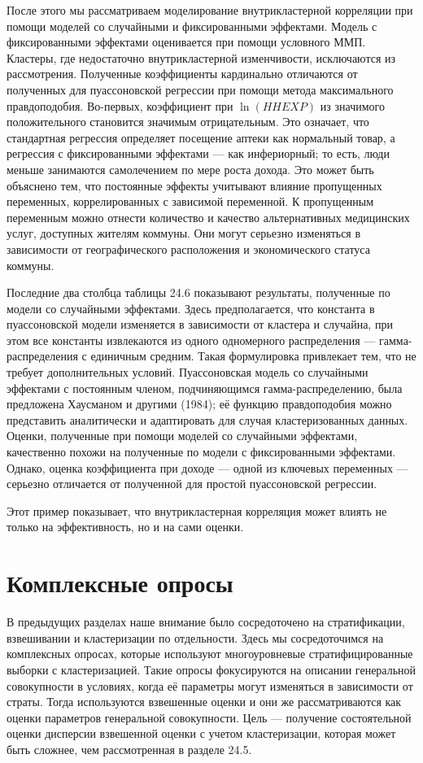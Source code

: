 После этого мы рассматриваем моделирование внутрикластерной корреляции при помощи моделей со случайными и фиксированными эффектами. Модель с фиксированными эффектами оценивается при помощи условного ММП. Кластеры, где недостаточно внутрикластерной изменчивости, исключаются из рассмотрения. Полученные коэффициенты кардинально отличаются от полученных для пуассоновской регрессии при помощи метода максимального правдоподобия. Во-первых, коэффициент при $\ln(HHEXP)$ из значимого положительного становится значимым отрицательным. Это означает, что стандартная регрессия определяет посещение аптеки как нормальный товар, а регрессия с фиксированными эффектами --- как инфериорный; то есть, люди меньше занимаются самолечением по мере роста дохода. Это может быть объяснено тем, что постоянные эффекты учитывают влияние пропущенных переменных, коррелированных с зависимой переменной. К пропущенным переменным можно отнести количество и качество альтернативных медицинских услуг, доступных жителям коммуны. Они могут серьезно изменяться в зависимости от географического расположения и экономического статуса коммуны. 

Последние два столбца таблицы 24.6 показывают результаты, полученные по модели со случайными эффектами. Здесь предполагается, что константа в пуассоновской модели изменяется в зависимости от кластера и случайна, при этом все константы извлекаются из одного одномерного распределения --- гамма-распределения с единичным средним. Такая формулировка привлекает тем, что не требует дополнительных условий. Пуассоновская модель со случайными эффектами с постоянным членом, подчиняющимся гамма-распределению, была предложена Хаусманом и другими (1984); её функцию правдоподобия можно представить аналитически и адаптировать для случая кластеризованных данных. Оценки, полученные при помощи моделей со случайными эффектами, качественно похожи на полученные по модели с фиксированными эффектами. Однако, оценка коэффициента при доходе --- одной из ключевых переменных --- серьезно отличается от полученной для простой пуассоновской регрессии. 

Этот пример показывает, что внутрикластерная корреляция может влиять не только на эффективность, но и на сами оценки. 

\section{Комплексные опросы}

В предыдущих разделах наше внимание было сосредоточено на стратификации, взвешивании и кластеризации по отдельности. Здесь мы сосредоточимся на комплексных опросах, которые используют многоуровневые стратифицированные выборки с кластеризацией. Такие опросы фокусируются на описании генеральной совокупности в условиях, когда её параметры могут изменяться в зависимости от страты. Тогда используются взвешенные оценки и они же рассматриваются как оценки параметров генеральной совокупности. Цель --- получение состоятельной оценки дисперсии взвешенной оценки с учетом кластеризации, которая может быть сложнее, чем рассмотренная в разделе 24.5. 

